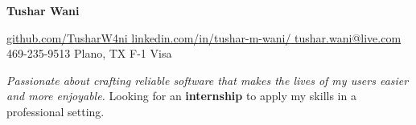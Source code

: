 \documentclass[letterpaper,11pt]{article}
\begin{document}

\begin{center}
    \textbf{\Huge Tushar Wani} \\ \vspace{2pt}

    \small \href{https://github.com/TusharW4ni}{\faGithub \hspace{1pt} \underline{github.com/TusharW4ni} \hspace{1pt}}
    \small \href{https://www.linkedin.com/in/tushar-m-wani/}{\faLinkedin \hspace{1pt} \underline{linkedin.com/in/tushar-m-wani/} \hspace{1pt}}
    \small \href{mailto:tushar.wani@live.com}{\faEnvelope \hspace{1pt} \underline{tushar.wani@live.com} \hspace{1pt}}
    \small \faMobile \hspace{0pt} 469-235-9513 \hspace{1pt}
    \small \faMapMarker \hspace{0pt} Plano, TX \hspace{1pt}
    \small \faMapPin \hspace{0pt} F-1 Visa
\end{center}

\begin{center}
  \emph{Passionate about crafting reliable software that makes the lives of my users easier and more enjoyable.}
  \newline
  Looking for an \textbf{internship} to apply my skills in a professional setting.
\end{center}
\end{document}
